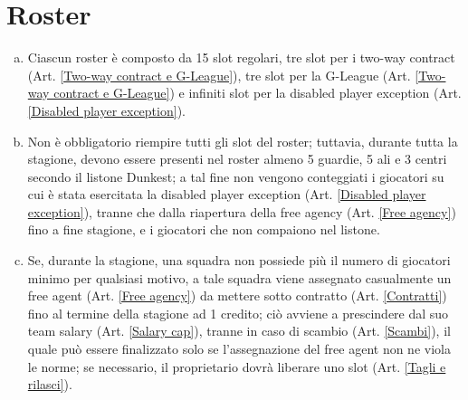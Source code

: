 \documentclass{article}
\begin{document}
\section{Roster}\label{Roster}
\begin{enumerate}[(a)]
\item Ciascun roster è composto da 15 slot regolari, tre slot per i two-way contract (Art. \ref{Two-way contract e G-League}), tre slot per la G-League (Art. \ref{Two-way contract e G-League}) e infiniti slot per la disabled player exception (Art. \ref{Disabled player exception}).
\item Non è obbligatorio riempire tutti gli slot del roster; tuttavia, durante tutta la stagione, devono essere presenti nel roster almeno 5 guardie, 5 ali e 3 centri secondo il listone Dunkest; a tal fine non vengono conteggiati i giocatori su cui è stata esercitata la disabled player exception (Art. \ref{Disabled player exception}), tranne che dalla riapertura della free agency (Art. \ref{Free agency}) fino a fine stagione, e i giocatori che non compaiono nel listone.
\item Se, durante la stagione, una squadra non possiede più il numero di giocatori minimo per qualsiasi motivo, a tale squadra viene assegnato casualmente un free agent (Art. \ref{Free agency}) da mettere sotto contratto (Art. \ref{Contratti}) fino al termine della stagione ad 1 credito; ciò avviene a prescindere dal suo team salary (Art. \ref{Salary cap}), tranne in caso di scambio (Art. \ref{Scambi}), il quale può essere finalizzato solo se l'assegnazione del free agent non ne viola le norme; se necessario, il proprietario dovrà liberare uno slot (Art. \ref{Tagli e rilasci}).
\end{enumerate}
\end{document}
